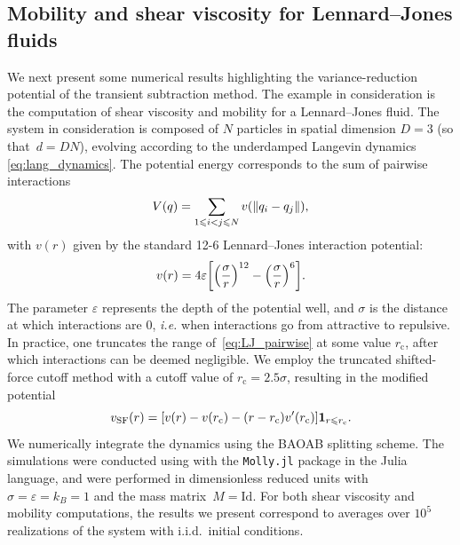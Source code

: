 \subsection{Mobility and shear viscosity for Lennard--Jones fluids}
\label{subsec:num_LJ}
%
We next present some numerical results highlighting the variance-reduction potential of the transient subtraction method. The example in consideration is the computation of shear viscosity and mobility for a Lennard--Jones fluid. The system in consideration is composed of $N$ particles in spatial dimension $D=3$ (so that~$d=DN$), evolving according to the underdamped Langevin dynamics \eqref{eq:lang_dynamics}. The potential energy corresponds to the sum of pairwise interactions
%
\begin{equation}
	V(q) = \sum_{1\leqslant i<j\leqslant N} v(\lVert q_i - q_j\rVert),
\end{equation}
%
with $v(r)$ given by the standard 12-6 Lennard--Jones interaction potential:
%
\begin{equation}
	v(r) = 4\eps\bkt*{\paren*{\frac{\sigma}{r}}^{12} - \paren*{\frac{\sigma}{r}}^6}.
	\label{eq:LJ_pairwise}
\end{equation}
%
The parameter $\varepsilon$ represents the depth of the potential well, and $\sigma$ is the distance at which interactions are 0, \emph{i.e.} when interactions go from attractive to repulsive. In practice, one truncates the range of~\eqref{eq:LJ_pairwise} at some value $r_\mathrm{c}$, after which interactions can be deemed negligible. We employ the truncated shifted-force cutoff method with a cutoff value of $r_\mathrm{c}=2.5\sigma$, resulting in the modified potential
%
\begin{equation}
	v_\mathrm{SF}(r) = [v(r) - v(r_\mathrm{c}) - (r - r_\mathrm{c})v'(r_\mathrm{c})]\mathbf{1}_{r\leqslant r_\mathrm{c}}.
\end{equation}
%  
We numerically integrate the dynamics using the BAOAB splitting scheme. The simulations were conducted using with the \texttt{Molly.jl} package \cite{greener2024} in the Julia language, and were performed in dimensionless reduced units with $\sigma = \varepsilon = k_B = 1$ and the mass matrix~$M = \mathrm{Id}$. For both shear viscosity and mobility computations, the results we present correspond to averages over $10^5$ realizations of the system with i.i.d.\ initial conditions. 

